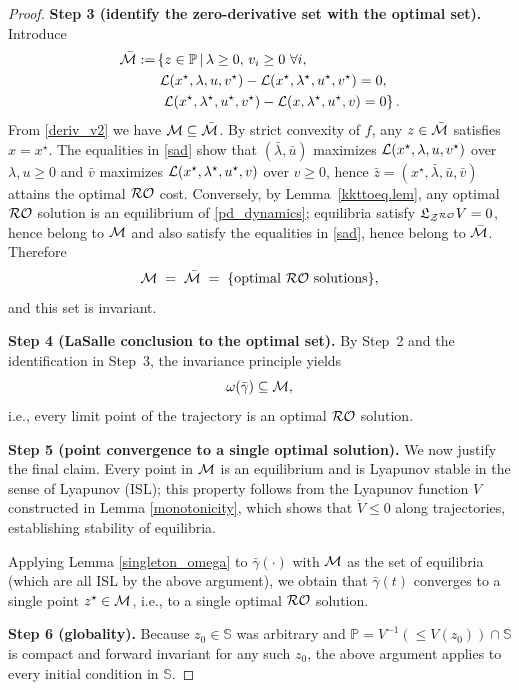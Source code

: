 \documentclass[journal,twoside,web]{ieeecolor}
\newcommand{\rev}[1]{#1}
\begin{document}
\begin{proof}
\medskip
\rev{\textbf{Step 3 (identify the zero-derivative set with the optimal set).}
Introduce
\begin{align}
\bar{\cal M}:=& \left\{z \in \mathbb P\,\middle|\,\lambda\geq 0,\, v_i\geq 0\ \forall i,\right.\nonumber\\
&\ {\cal L}(x^\star,\lambda,u,v^\star)-{\cal L}(x^\star,\lambda^\star,u^\star,v^\star)=0,\nonumber\\
&\left.\ {\cal L}(x^\star,\lambda^\star,u^\star,v^\star)-{\cal L}(x,\lambda^\star,u^\star,v)=0 \right\}.
\label{sad}
\end{align}
From \eqref{deriv_v2} we have ${\cal M}\subseteq \bar{\cal M}$.
By strict convexity of $f$, any $z\in\bar{\cal M}$ satisfies $x=x^\star$. The equalities in \eqref{sad} show that $(\bar\lambda,\bar u)$ maximizes ${\cal L}(x^\star,\lambda,u,v^\star)$ over $\lambda,u\ge 0$ and $\bar v$ maximizes ${\cal L}(x^\star,\lambda^\star,u^\star,v)$ over $v\ge 0$, hence $\bar z=(x^\star,\bar\lambda,\bar u,\bar v)$ attains the optimal ${\cal RO}$ cost.
Conversely, by Lemma~\ref{kkttoeq.lem}, any optimal ${\cal RO}$ solution is an equilibrium of \eqref{pd_dynamics}; equilibria satisfy $\mathfrak{L}_{{\cal Z}^{\cal RO}}V=0$, hence belong to ${\cal M}$ and also satisfy the equalities in \eqref{sad}, hence belong to $\bar{\cal M}$. Therefore
\[
{\cal M}\;=\;\bar{\cal M}\;=\;\{\text{optimal ${\cal RO}$ solutions}\},
\]
and this set is invariant.}

\medskip
\rev{\textbf{Step 4 (LaSalle conclusion to the optimal set).}
By Step~2 and the identification in Step~3, the invariance principle yields
\[
\omega(\bar\gamma)\subseteq {\cal M},
\]
i.e., every limit point of the trajectory is an optimal ${\cal RO}$ solution.}

\medskip
\rev{\textbf{Step 5 (point convergence to a single optimal solution).}
We now justify the final claim. Every point in ${\cal M}$ is an equilibrium and is Lyapunov stable in the sense of Lyapunov (ISL); this property follows from the Lyapunov function $V$ constructed in Lemma \ref{monotonicity}, which shows that $\dot{V} \leq 0$ along trajectories, establishing stability of equilibria.

Applying Lemma \ref{singleton_omega} to $\bar\gamma(\cdot)$ with ${\cal M}$ as the set of equilibria (which are all ISL by the above argument), we obtain that $\bar\gamma(t)$ converges to a single point $z^\star\in{\cal M}$, i.e., to a single optimal ${\cal RO}$ solution.}

\medskip
\rev{\textbf{Step 6 (globality).}
Because $z_0\in\mathbb S$ was arbitrary and $\mathbb P=V^{-1}(\le V(z_0))\cap\mathbb S$ is compact and forward invariant for any such $z_0$, the above argument applies to every initial condition in $\mathbb S$.}
\end{proof}
\fi
\end{document}
